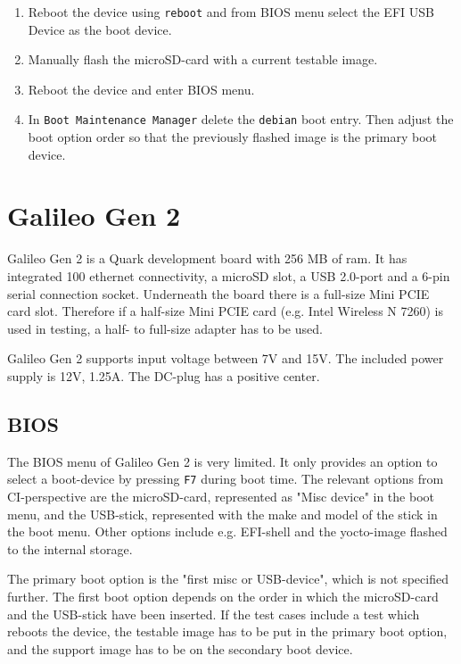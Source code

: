 \documentclass[a4paper,11pt]{article}
\newcommand{\cmd}[1]{\texttt{#1}}
\begin{document}
\begin{enumerate}
\item Reboot the device using \cmd{reboot} and from BIOS menu select the EFI USB Device as the boot device.

\item Manually flash the microSD-card with a current testable image.

\item Reboot the device and enter BIOS menu.

\item In \cmd{Boot Maintenance Manager} delete the \cmd{debian} boot entry. Then adjust the boot option order so that the previously flashed image is the primary boot device.
\end{enumerate}

\pagebreak

\section{Galileo Gen 2}
\label{galileo}

Galileo Gen 2 is a Quark development board with 256 MB of ram. It has integrated 100 ethernet connectivity, a microSD slot, a USB 2.0-port and a 6-pin serial connection socket. Underneath the board there is a full-size Mini PCIE card slot. Therefore if a half-size Mini PCIE card (e.g. Intel Wireless N 7260) is used in testing, a half- to full-size adapter has to be used.

Galileo Gen 2 supports input voltage between 7V and 15V. The included power supply is 12V, 1.25A. The DC-plug has a positive center.

\subsection{BIOS}
The BIOS menu of Galileo Gen 2 is very limited. It only provides an option to select a boot-device by pressing \cmd{F7} during boot time. The relevant options from CI-perspective are the microSD-card, represented as "Misc device" in the boot menu, and the USB-stick, represented with the make and model of the stick in the boot menu. Other options include e.g. EFI-shell and the yocto-image flashed to the internal storage.

The primary boot option is the "first misc or USB-device", which is not specified further. The first boot option depends on the order in which the microSD-card and the USB-stick have been inserted. If the test cases include a test which reboots the device, the testable image has to be put in the primary boot option, and the support image has to be on the secondary boot device.
\end{document}
